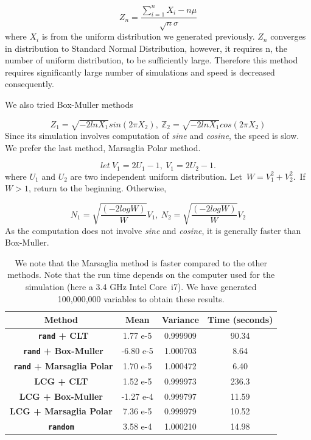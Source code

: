 \documentclass[11pt,a4paper,fleqn]{article}
\newcommand\Z{\mathbb Z}
\begin{document}
$$ Z_n = \frac{\sum_{i=1}^{n}X_i-n\mu}{\sqrt{n}\sigma}$$where $X_i$ is from the uniform distribution we generated previously. $Z_n$ converges in distribution to Standard Normal Distribution, however, it requires n, the number of uniform distribution, to be sufficiently large. Therefore this method requires significantly large number of simulations and speed is decreased consequently.

We also tried Box-Muller methods  \cite{lectures}

$$Z_1 = \sqrt{-2lnX_1}sin(2\pi X_2),\  \Z_2=\sqrt{-2lnX_1}cos(2\pi X_2)$$Since its simulation involves computation of \textit{sine} and \textit{cosine}, the speed is slow.
We prefer the last method, Marsaglia Polar method.

$$ let \ V_1 = 2U_1-1,\  V_1 = 2U_2-1.$$
where $U_1$ and $U_2$ are two independent uniform distribution.
 Let\ $W = V_1^2+V_2^2.$\ If $W>1$, return to the beginning. Otherwise,

$$N_1 = \sqrt{\frac{(-2logW)}{W}}V_1,\ N_2 = \sqrt{\frac{(-2logW)}{W}}V_2$$As the computation does not involve \textit{sine} and \textit{cosine}, it is generally faster than Box-Muller.



\begin{table} [h!]
\centering
\begin{tabular}{| c| c| c| c| }
\hline
\textbf{ Method} &\textbf{ Mean} & \textbf{Variance}&\textbf{ Time (seconds)} \\ \hline
\textbf{\texttt{ rand}  + CLT} & 1.77 e-5 & 0.999909 & 90.34 \\  \hline
\textbf{\texttt{ rand}  + Box-Muller} & -6.80 e-5 & 1.000703&8.64\\ \hline
\textbf{\texttt{ rand}  + Marsaglia Polar} & 1.70 e-5& 1.000472& 6.40\\ \hline
\textbf{ LCG + CLT} & 1.52 e-5& 0.999973&236.3\\ \hline
\textbf{LCG + Box-Muller} & -1.27 e-4 & 0.999797&11.59\\ \hline
\textbf{ LCG + Marsaglia Polar} & 7.36 e-5 & 0.999979&10.52\\ \hline
\textbf{\texttt{random} }& 3.58 e-4 & 1.000210&14.98\\ \hline
\end{tabular}
\caption{We note that the Marsaglia method is faster compared to the other methods. Note that the run time depends on the computer used for the simulation (here a 3.4 GHz Intel Core~i7). We have generated 100,000,000 variables to obtain these results.}
\end{table}
\end{document}
